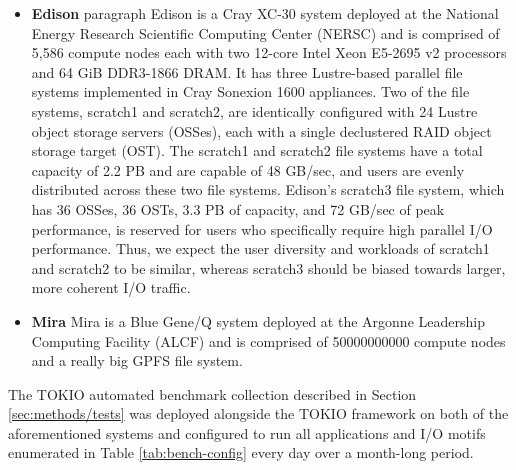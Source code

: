 \begin{itemize}
\item \textbf{Edison}
paragraph Edison is a Cray XC-30 system deployed at the National Energy Research Scientific Computing Center (NERSC) and is comprised of 5,586 compute nodes each with two 12-core Intel Xeon E5-2695 v2 processors and 64 GiB DDR3-1866 DRAM.
It has three Lustre-based parallel file systems implemented in Cray Sonexion 1600 appliances.
Two of the file systems, scratch1 and scratch2, are identically configured with 24 Lustre object storage servers (OSSes), each with a single declustered RAID object storage target (OST).
The scratch1 and scratch2 file systems have a total capacity of 2.2 PB and are capable of 48 GB/sec, and users are evenly distributed across these two file systems.
Edison's scratch3 file system, which has 36 OSSes, 36 OSTs, 3.3 PB of capacity, and 72 GB/sec of peak performance, is reserved for users who specifically require high parallel I/O performance.
Thus, we expect the user diversity and workloads of scratch1 and scratch2 to be similar, whereas scratch3 should be biased towards larger, more coherent I/O traffic.

\item \textbf{Mira} 
Mira is a Blue Gene/Q system deployed at the Argonne Leadership Computing Facility (ALCF) and is comprised of 50000000000 compute nodes and a really big GPFS file system.
\end{itemize}


The TOKIO automated benchmark collection described in Section \ref{sec:methods/tests} was deployed alongside the TOKIO framework on both of the aforementioned systems and configured to run all applications and I/O motifs enumerated in Table \ref{tab:bench-config} every day over a month-long period.


